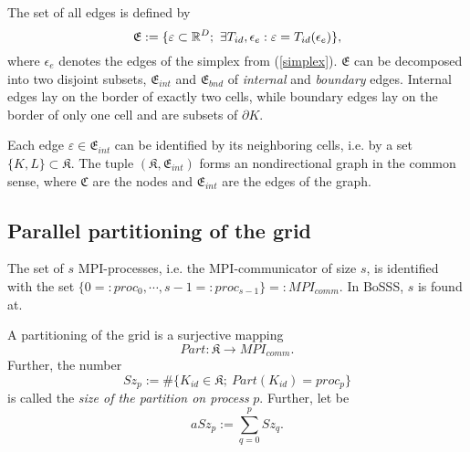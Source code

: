

\begin{myDef}
The set of all edges is defined by
\[
  \mathfrak{E} := \{ \varepsilon \subset \real^D; \ \exists T_{id}, \epsilon_e: \varepsilon = T_{id}(\epsilon_e) \},
\]
where $\epsilon_e$ denotes the edges of the simplex from (\ref{simplex}).
$\mathfrak{E}$ can be decomposed into two disjoint subsets,
$\mathfrak{E}_{int}$ and $\mathfrak{E}_{bnd}$
of \emph{internal} and \emph{boundary} edges.
Internal edges lay on the border of exactly two cells, while
boundary edges lay on the border of only one cell and are subsets of $\partial K$.
\end{myDef}

\begin{myRem}
Each edge $\varepsilon \in \mathfrak{E}_{int}$ can be identified
by its neighboring cells, i.e.
by a set $\{ K, L \} \subset \mathfrak{K}$.
The tuple $(\mathfrak{K},\mathfrak{E}_{int})$ forms an nondirectional graph
in the common sense, where $\mathfrak{C}$ are the nodes and $\mathfrak{E}_{int}$
are the edges of the graph.
\end{myRem}

\subsection{Parallel partitioning of the grid}

\begin{myNot}
The set of $s$ MPI-processes, i.e. the MPI-communicator of size $s$,
 is identified with the set
$\{0 =: proc_0,\cdots,s-1 =: proc_{s-1}\} =: MPI_{comm}$.
In BoSSS, $s$ is found at.
\label{MPI_comm}
\end{myNot}

\begin{myDef}
A partitioning of the grid is a surjective mapping
\[
  Part : \mathfrak{K} \rightarrow MPI_{comm}.
\]
Further, the number
\[
  Sz_p := \# \{ K_{id} \in \mathfrak{K}; \ Part(K_{id}) = proc_p \}
\]
is called the \emph{size of the partition on process} $p$. Further, let be
\[
  aSz_p := \sum_{q=0}^{p} Sz_q.
\]
\end{myDef}

